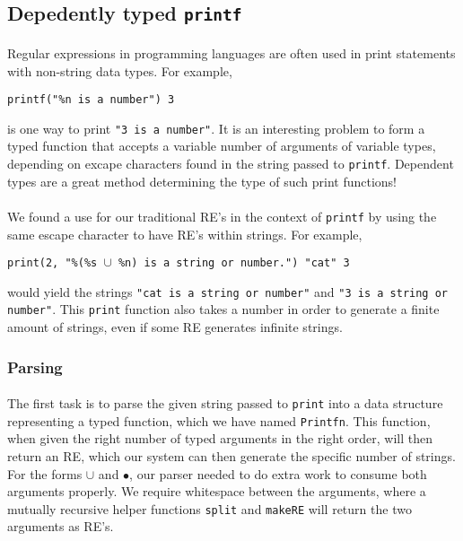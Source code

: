 \documentclass[12pt]{article}
\begin{document}
\subsection{Depedently typed \texttt{printf}}
\paragraph{} Regular expressions in programming languages are often used in print statements with non-string data types. For example,
\begin{center}\texttt{printf("\%n is a number") 3} \end{center}
is one way to print \texttt{"3 is a number"}. It is an interesting problem to form a typed function that accepts a variable number of arguments of variable types, depending on excape characters found in the string passed to \texttt{printf}. Dependent types are a great method determining the type of such print functions!
\paragraph{}
We found a use for our traditional RE's in the context of \texttt{printf} by using the same escape character to have RE's within strings. For example,
\begin{center} \texttt{print(2, "\%(\%s $\cup$ \%n) is a string or number.") "cat" 3} \end{center}
would yield the strings \texttt{"cat is a string or number"} and \texttt{"3 is a string or number"}. This \texttt{print} function also takes a number in order to generate a finite amount of strings, even if some RE generates infinite strings.

\subsubsection{Parsing}
\paragraph{}
The first task is to parse the given string passed to \texttt{print} into a data structure representing a typed function, which we have named \texttt{Printfn}. This function, when given the right number of typed arguments in the right order, will then return an RE, which our system can then generate the specific number of strings. For the forms $\cup$ and $\bullet$, our parser needed to do extra work to consume both arguments properly. We require whitespace between the arguments, where a mutually recursive helper functions \texttt{split} and \texttt{makeRE} will return the two arguments as RE's.
\end{document}
